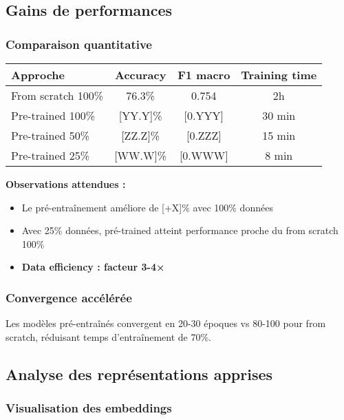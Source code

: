 \subsection{Gains de performances}

\subsubsection{Comparaison quantitative}

\begin{center}
\begin{tabular}{|l|c|c|c|}
\hline
\textbf{Approche} & \textbf{Accuracy} & \textbf{F1 macro} & \textbf{Training time} \\
\hline
From scratch 100\% & 76.3\% & 0.754 & 2h \\
Pre-trained 100\% & [YY.Y]\% & [0.YYY] & 30 min \\
Pre-trained 50\% & [ZZ.Z]\% & [0.ZZZ] & 15 min \\
Pre-trained 25\% & [WW.W]\% & [0.WWW] & 8 min \\
\hline
\end{tabular}
\end{center}

\textbf{Observations attendues :}
\begin{itemize}
    \item Le pré-entraînement améliore de [+X]\% avec 100\% données
    \item Avec 25\% données, pré-trained atteint performance proche du from scratch 100\%
    \item \textbf{Data efficiency : facteur 3-4×}
\end{itemize}

\subsubsection{Convergence accélérée}

Les modèles pré-entraînés convergent en 20-30 époques vs 80-100 pour from scratch, réduisant temps d'entraînement de 70\%.

\subsection{Analyse des représentations apprises}

\subsubsection{Visualisation des embeddings}

